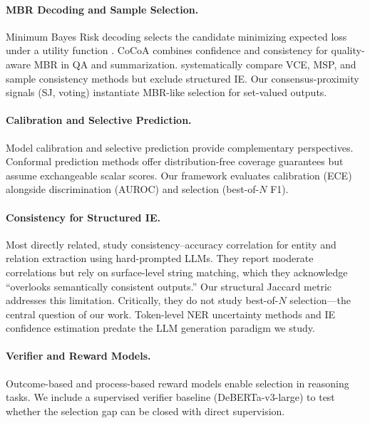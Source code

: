 \documentclass[11pt,a4paper]{article}
\begin{document}
\paragraph{MBR Decoding and Sample Selection.}
Minimum Bayes Risk decoding selects the candidate minimizing expected loss under a utility function \cite{eikema2020map}. CoCoA \cite{cocoa2025} combines confidence and consistency for quality-aware MBR in QA and summarization. \citet{vashurin2025systematic} systematically compare VCE, MSP, and sample consistency methods but exclude structured IE. Our consensus-proximity signals (SJ, voting) instantiate MBR-like selection for set-valued outputs.

\paragraph{Calibration and Selective Prediction.}
Model calibration \cite{guo2017calibration,desai2020calibration} and selective prediction \cite{geifman2017selective,knowyourlimits2025} provide complementary perspectives. Conformal prediction methods \cite{fisch2021conformal,angelopoulos2021sets} offer distribution-free coverage guarantees but assume exchangeable scalar scores. Our framework evaluates calibration (ECE) alongside discrimination (AUROC) and selection (best-of-$N$ F1).

\paragraph{Consistency for Structured IE.}
Most directly related, \citet{nedellec2026consistency} study consistency--accuracy correlation for entity and relation extraction using hard-prompted LLMs. They report moderate correlations but rely on surface-level string matching, which they acknowledge ``overlooks semantically consistent outputs.'' Our structural Jaccard metric addresses this limitation. Critically, they do not study best-of-$N$ selection---the central question of our work. Token-level NER uncertainty methods \cite{xiao2019quantifying,shelmanov2021certain} and IE confidence estimation \cite{culotta2004confidence} predate the LLM generation paradigm we study.

\paragraph{Verifier and Reward Models.}
Outcome-based \cite{cobbe2021training} and process-based \cite{lightman2023lets} reward models enable selection in reasoning tasks. We include a supervised verifier baseline (DeBERTa-v3-large) to test whether the selection gap can be closed with direct supervision.
\end{document}
